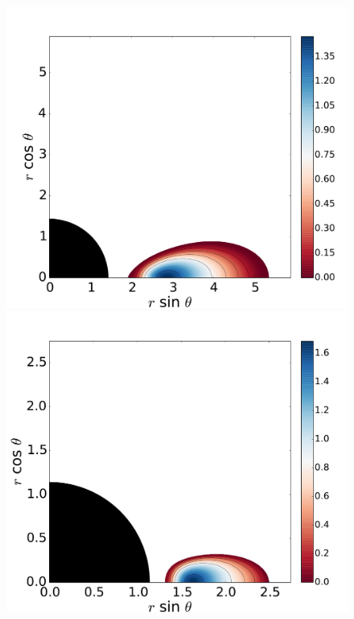 \documentclass{aa}
\begin{document}
\begin{figure}
\includegraphics[scale=0.16]{figures/fig2_2_2.pdf}
\hspace{-0.2cm}
\includegraphics[scale=0.16]{figures/fig2_2_3.pdf}
\\

\end{figure}
\end{document}
